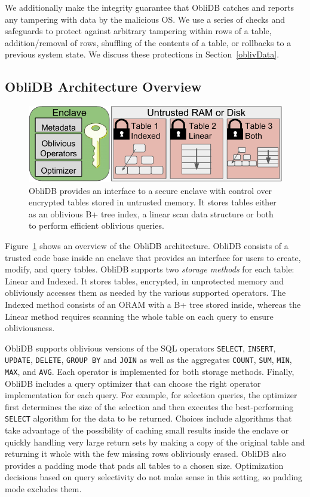 \documentclass[letterpaper,twocolumn,10pt]{article}
\def\name/{ObliDB}
\begin{document}
We additionally make the integrity guarantee that \name/ catches and reports any tampering with data by the malicious OS. We use a series of checks and safeguards to protect against arbitrary tampering within rows of a table, addition/removal of rows, shuffling of the contents of a table, or rollbacks to a previous system state. We discuss these protections in Section~\ref{oblivData}.

\subsection{\name/ Architecture Overview}
\begin{figure}
\centering
\includegraphics[width=\linewidth]{figure_revised.pdf}
\caption{\small \name/ provides an interface to a secure enclave with control over encrypted tables stored in untrusted memory. It stores tables either as an oblivious B+ tree index, a linear scan data structure or both to perform efficient oblivious queries.}
\label{arch}
\end{figure}
Figure~\ref{arch} shows an overview of the \name/ architecture. \name/ consists of a trusted code base inside an enclave that provides an interface for users to create, modify, and query tables. \name/ supports two \emph{storage methods} for each table: Linear and Indexed. It stores tables, encrypted, in unprotected memory and obliviously accesses them as needed by the various supported operators. The Indexed method consists of an ORAM with a B+ tree stored inside, whereas the Linear method requires scanning the whole table on each query to ensure obliviousness.

  \name/ supports oblivious versions of the SQL operators \texttt{SELECT}, \texttt{INSERT}, \texttt{UPDATE}, \texttt{DELETE}, \texttt{GROUP BY} and \texttt{JOIN} as well as the aggregates \texttt{COUNT}, \texttt{SUM}, \texttt{MIN}, \texttt{MAX}, and \texttt{AVG}. Each operator is implemented for both storage methods. Finally, ObliDB includes a query optimizer that can choose the right operator implementation for each query. For example, for selection queries, the optimizer first determines the size of the selection and then executes the best-performing \texttt{SELECT} algorithm for the data to be returned. Choices include algorithms that take advantage of the possibility of caching small results inside the enclave or quickly handling very large return sets by making a copy of the original table and returning it whole with the few missing rows obliviously erased. \name/ also provides a padding mode that pads all tables to a chosen size. Optimization decisions based on query selectivity do not make sense in this setting, so padding mode excludes them.
\end{document}
